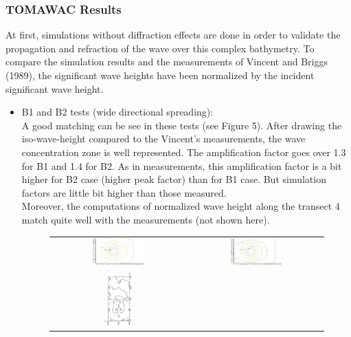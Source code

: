 \subsubsection{TOMAWAC Results }
At first, simulations without diffraction effects are done in order to validate the propagation and refraction of the wave over this complex bathymetry. To compare the simulation results and the measurements of Vincent and Briggs (1989), the significant wave heights have been normalized by the incident significant wave height.\\
\begin{itemize}
\item B1 and B2 tests (wide directional spreading):\\
A good matching can be see in these tests (see Figure 5). After drawing the iso-wave-height compared to the Vincent's measurements, the wave concentration zone is well represented. The amplification factor goes over 1.3 for B1 and 1.4 for B2. As in measurements, this amplification factor is a bit higher for B2 case (higher peak factor) than for B1 case. But simulation factors are little bit higher than those measured.\\
Moreover, the computations of normalized wave height along the transect 4 match quite well with the measurements (not shown here).\\
\begin{figure}[H]
  \centering
  \begin{tabular}{cc}
  	\includegraphics[width=0.4\textwidth]{iso-B1.jpg}&\includegraphics[width=0.4\textwidth]{iso-B2.jpg}\\
  	\includegraphics[width=0.22\textwidth,angle=-90]{B1_m.JPG}

\end{tabular}
\end{figure}
\end{itemize}
